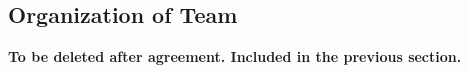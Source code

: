\subsection*{Organization of Team}

{\color{red}\textbf{To be deleted after agreement. Included in the previous section.}}